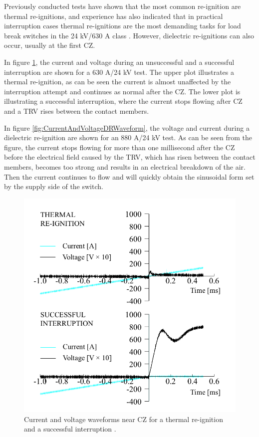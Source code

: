 \documentclass[10pt,b5paper,twoside]{article}
\begin{document}
Previously conducted tests have shown that the most common re-ignition are thermal re-ignitions, and experience has also indicated that in practical interruption cases thermal re-ignitions are the most demanding tasks for load break switches in the 24 kV/630 A class \cite{bib:AFIMVLBA}. However, dielectric re-ignitions can also occur, usually at the first CZ.

In figure \ref{fig:CurrentAndVoltageWaveform}, the current and voltage during an unsuccessful and a successful interruption are shown for a 630 A/24 kV test. The upper plot illustrates a thermal re-ignition, as can be seen the current is almost unaffected by the interruption attempt and continues as normal after the CZ. The lower plot is illustrating a successful interruption, where the current stops flowing after CZ and a TRV rises between the contact members. 

In figure \ref{fig:CurrentAndVoltageDRWaveform}, the voltage and current during a dielectric re-ignition are shown for an 880 A/24 kV test. As can be seen from the figure, the current stops flowing for more than one millisecond after the CZ before the electrical field caused by the TRV, which has risen between the contact members, becomes too strong and results in an electrical breakdown of the air. Then the current continues to flow and will quickly obtain the sinusoidal form set by the supply side of the switch. 

\begin{figure}[H]
\centering
\includegraphics[scale=0.32]{Bilder/Results/differentInterruptions.png}
\caption{Current and voltage waveforms near CZ for a thermal re-ignition and a successful interruption \cite{bib:AFIMVLBA}.} \label{fig:CurrentAndVoltageWaveform}
\end{figure}
\end{document}
